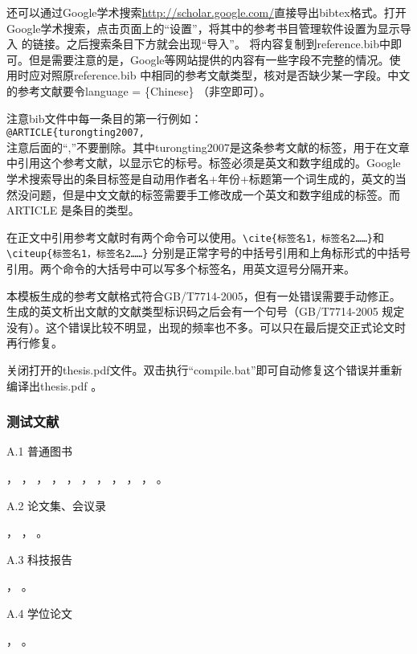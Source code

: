 还可以通过Google学术搜索\url{http://scholar.google.com/}直接导出bibtex格式。打开Google学术搜索，点击页面上的“设置”，将其中的参考书目管理软件设置为显示导入\BibTeX{} 的链接。之后搜索条目下方就会出现“导入\BibTeX{}”。 将内容复制到reference.bib中即可。但是需要注意的是，Google等网站提供的内容有一些字段不完整的情况。使用时应对照原reference.bib 中相同的参考文献类型，核对是否缺少某一字段。中文的参考文献要令language = \{Chinese\} （非空即可）。

注意bib文件中每一条目的第一行例如：\\
\verb|@ARTICLE{turongting2007,|\\
注意后面的“,”不要删除。其中turongting2007是这条参考文献的标签，用于在文章中引用这个参考文献，以显示它的标号。标签必须是英文和数字组成的。Google 学术搜索导出的条目标签是自动用作者名+年份+标题第一个词生成的，英文的当然没问题，但是中文文献的标签需要手工修改成一个英文和数字组成的标签。而ARTICLE 是条目的类型。

在正文中引用参考文献时有两个命令可以使用。\verb|\cite{标签名1，标签名2……}|和\verb|\citeup{标签名1，标签名2……}| 分别是正常字号的中括号引用和上角标形式的中括号引用。两个命令的大括号中可以写多个标签名，用英文逗号分隔开来。\par

本模板生成的参考文献格式符合GB/T7714-2005，但有一处错误需要手动修正。生成的英文析出文献的文献类型标识码之后会有一个句号（GB/T7714-2005 规定没有）。这个错误比较不明显，出现的频率也不多。可以只在最后提交正式论文时再行修复。

关闭打开的thesis.pdf文件。双击执行“compile.bat”即可自动修复这个错误并重新编译出thesis.pdf 。

\subsubsection{测试文献}


A.1 普通图书

\cite{gxzzzzqlyt1993}，
\cite{jiangyouxu1998}，
\cite{tangxujun1999}，
\cite{zhaokaihua1995}，
\cite{wangang1912}，
\cite{zhaoyaodong1998}，
\cite{crawfprd1995}，
\cite{iflai1977}，
\cite{obrien1994}，
\cite{rood2001}，
\cite{angwen1988}。

A.2 论文集、会议录

\cite{zglxxh1990}，
\cite{ROSENTHALL1963}，
\cite{GANZHA2000}。

A.3 科技报告

\cite{dtha1990}，
\cite{who1970}。

A.4 学位论文

\cite{ZHANGZHIXIANG1998}，
\cite{CALMS1965}。

